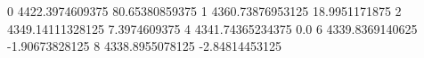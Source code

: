 0 4422.3974609375 80.65380859375
1 4360.73876953125 18.9951171875
2 4349.14111328125 7.3974609375
4 4341.74365234375 0.0
6 4339.8369140625 -1.90673828125
8 4338.8955078125 -2.84814453125
